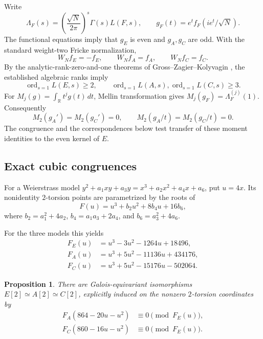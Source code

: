 \documentclass[11pt]{article}
\newtheorem{proposition}{Proposition}
\begin{document}
Write
\[
\Lambda_F(s)=
 \left(\frac{\sqrt N}{2\pi}\right)^s
 \Gamma(s)L(F,s),\qquad
g_F(t)=e^t f_F(ie^t/\sqrt N).
\]
The functional equations imply that \(g_E\) is even and
\(g_A,g_C\) are odd. With the standard weight-two Fricke
normalization,
\[
W_Nf_E=-f_E,\qquad W_Nf_A=f_A,\qquad W_Nf_C=f_C.
\]
By the analytic-rank-zero-and-one theorems of
Gross--Zagier--Kolyvagin \cite{GZK}, the established algebraic ranks imply
\[
\operatorname{ord}_{s=1}L(E,s)\ge2,\qquad
\operatorname{ord}_{s=1}L(A,s),
\operatorname{ord}_{s=1}L(C,s)\ge3.
\]
For \(M_j(g)=\int_{\mathbb R}t^jg(t)\,dt\), Mellin transformation gives
\(M_j(g_F)=\Lambda_F^{(j)}(1)\). Consequently
\[
M_2(g_A')=M_2(g_C')=0,\qquad
M_2(g_A/t)=M_2(g_C/t)=0.
\]
The congruence and the correspondences below test transfer of these moment identities to the even kernel of \(E\).

\subsection{Exact cubic congruences}

For a Weierstrass model
\(y^2+a_1xy+a_3y=x^3+a_2x^2+a_4x+a_6\),
put \(u=4x\). Its nonidentity \(2\)-torsion points are
parametrized by the roots of
\[
F(u)=u^3+b_2u^2+8b_4u+16b_6,
\]
where
\(b_2=a_1^2+4a_2\),
\(b_4=a_1a_3+2a_4\), and
\(b_6=a_3^2+4a_6\).

For the three models this yields
\[
\begin{aligned}
F_E(u)&=u^3-3u^2-1264u+18496,\\
F_A(u)&=u^3+5u^2-11136u+434176,\\
F_C(u)&=u^3+5u^2-15176u-502064.
\end{aligned}
\]

\begin{proposition}
There are Galois-equivariant isomorphisms
\(E[2]\simeq A[2]\simeq C[2]\), explicitly induced on
the nonzero \(2\)-torsion coordinates by
\[
\boxed{
\begin{aligned}
F_A(864-20u-u^2)&\equiv0\pmod{F_E(u)},\\
F_C(860-16u-u^2)&\equiv0\pmod{F_E(u)}.
\end{aligned}}
\]
\end{proposition}
\end{document}
